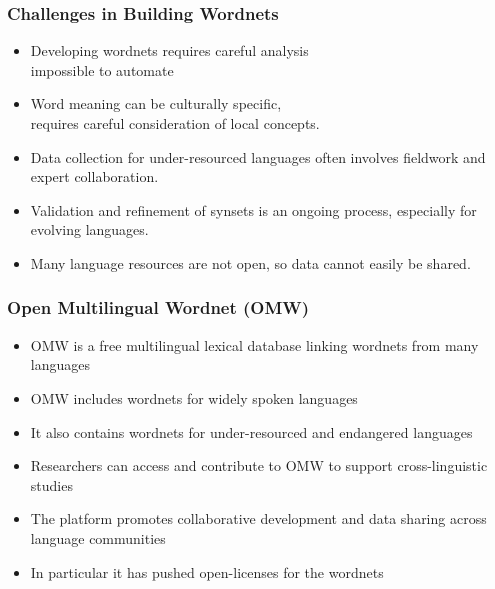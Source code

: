 \documentclass[xetex]{beamer}  %
\begin{document}
\begin{frame}
\frametitle{Challenges in Building Wordnets}

\begin{itemize}
    \item Developing wordnets requires careful analysis \\ impossible to automate
    \item Word meaning can be culturally specific, \\ requires careful consideration of local concepts.
    \item Data collection for under-resourced languages often involves fieldwork and expert collaboration.
    \item Validation and refinement of synsets is an ongoing process, especially for evolving languages.
    \item Many language resources are not open, so data cannot easily be shared.
\end{itemize}
\end{frame}



\begin{frame}
\frametitle{Open Multilingual Wordnet (OMW)}

\begin{itemize}
    \item OMW is a free multilingual lexical database linking wordnets from many languages \citep{Bond:Foster:2013}
    \item OMW includes wordnets for widely spoken languages
    \item It also contains wordnets for under-resourced and endangered languages
    \item Researchers can access and contribute to OMW to support cross-linguistic studies
    \item The platform promotes collaborative development and data sharing across language communities
    \item In particular it has pushed open-licenses for the wordnets
\end{itemize}
\end{frame}
\end{document}
